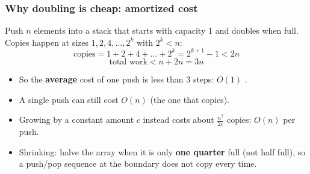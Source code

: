 \documentclass[aspectratio=169,10pt,compress]{beamer}
\begin{document}
\begin{frame}[t,fragile] \frametitle{Why doubling is cheap: amortized cost}
  Push $n$ elements into a stack that starts with capacity 1 and doubles when full.
  Copies happen at sizes $1, 2, 4, \dots, 2^{k}$ with $2^{k} < n$:
  \[
  	\text{copies} = 1 + 2 + 4 + \dots + 2^{k} = 2^{k+1} - 1 < 2n
  \]
  \[
  	\text{total work} < n + 2n = 3n
  \]
  \vspace{0.2em}
  \begin{itemize}
    \item So the \textbf{average} cost of one push is less than 3 steps: $O(1)$ .
    \item A single push can still cost $O(n)$ (the one that copies).
    \item Growing by a constant amount $c$ instead costs about $\frac{n^{2}}{2c}$ copies: $O(n)$ per push.
    \item Shrinking: halve the array when it is only \textbf{one quarter} full (not half full), so a push/pop sequence at the boundary does not copy every time.
  \end{itemize}
\end{frame}

\end{document}
